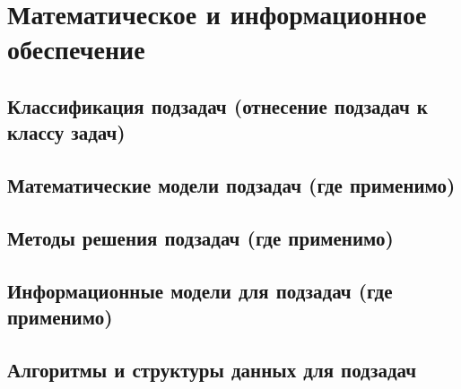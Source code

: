 \newpage
\section{Математическое и информационное обеспечение }

\subsection{Классификация подзадач (отнесение подзадач к классу задач)}
\subsection{Математические модели подзадач (где применимо)}
\subsection{Методы решения подзадач (где применимо)}
\subsection{Информационные модели для подзадач (где применимо)}
\subsection{Алгоритмы и структуры данных для подзадач}

